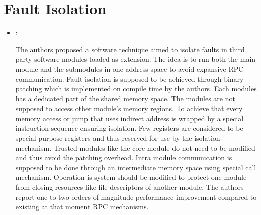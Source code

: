 \section*{Fault Isolation}
\begin{itemize}
    \item \cite{Wahbe:SoftwareFaultIsolation:1993}:

    The authors proposed a software technique aimed to isolate faults in third party software modules loaded as extension. The idea is to run both the main module and the submodules in one address space to avoid expansive RPC communication. Fault isolation is supposed to be achieved through binary patching which is implemented on compile time by the authors. Each modules has a dedicated part of the shared memory space. The modules are not supposed to access other module's memory regions. To achieve that every memory access or jump that uses indirect address is wrapped by a special instruction sequence ensuring isolation. Few registers are considered to be special purpose registers and thus reserved for use by the isolation mechanism. Trusted modules like the core module do not need to be modified and thus avoid the patching overhead. Intra module communication is supposed to be done through an intermediate memory space using special call mechanism. Operation is system should be modified to protect one module from closing resources like file descriptors of another module. The authors report one to two orders of magnitude performance improvement compared to existing at that moment RPC mechanisms.
\end{itemize}


